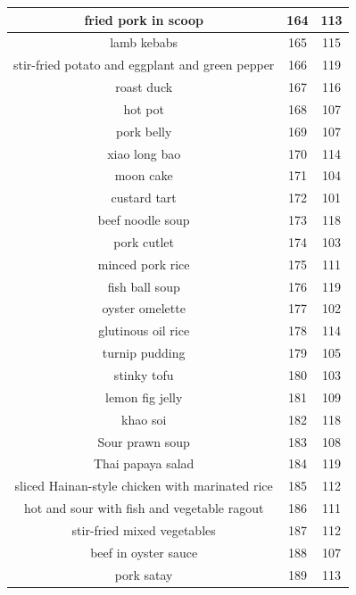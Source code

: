 {\begin{longtable}{| c | c | c|}
        \hline
        fried pork in scoop  &  164  &  113  \\
        \hline
        lamb kebabs  &  165  &  115  \\
        \hline
        stir-fried potato and eggplant and green pepper  &  166  &  119  \\
        \hline
        roast duck  &  167  &  116  \\
        \hline
        hot pot  &  168  &  107  \\
        \hline
        pork belly  &  169  &  107  \\
        \hline
        xiao long bao  &  170  &  114  \\
        \hline
        moon cake  &  171  &  104  \\
        \hline
        custard tart  &  172  &  101  \\
        \hline
        beef noodle soup  &  173  &  118  \\
        \hline
        pork cutlet  &  174  &  103  \\
        \hline
        minced pork rice  &  175  &  111  \\
        \hline
        fish ball soup  &  176  &  119  \\
        \hline
        oyster omelette  &  177  &  102  \\
        \hline
        glutinous oil rice  &  178  &  114  \\
        \hline
        turnip pudding  &  179  &  105  \\
        \hline
        stinky tofu  &  180  &  103  \\
        \hline
        lemon fig jelly  &  181  &  109  \\
        \hline
        khao soi  &  182  &  118  \\
        \hline
        Sour prawn soup  &  183  &  108  \\
        \hline
        Thai papaya salad  &  184  &  119  \\
        \hline
        sliced Hainan-style chicken with marinated rice  &  185  &  112  \\
        \hline
        hot and sour with fish and vegetable ragout  &  186  &  111  \\
        \hline
        stir-fried mixed vegetables  &  187  &  112  \\
        \hline
        beef in oyster sauce  &  188  &  107  \\
        \hline
        pork satay  &  189  &  113  \\

\end{longtable}}
